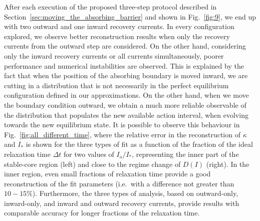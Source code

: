After each execution of the proposed three-step protocol described in Section~\ref{sec:moving_the_absorbing_barrier} and shown in Fig.~\ref{fig:9}, we end up with two outward and one inward recovery currents. In every configuration explored, we observe better reconstruction results when only the recovery currents from the outward step are considered. On the other hand, considering only the inward recovery currents or all currents simultaneously, poorer performance and numerical instabilities are observed. This is explained by the fact that when the position of the absorbing boundary is moved inward, we are cutting in a distribution that is not necessarily in the perfect equilibrium configuration defined in our approximations. On the other hand, when we move the boundary condition outward, we obtain a much more reliable observable of the distribution that populates the new available action interval, when evolving towards the new equilibrium state. It is possible to observe this behaviour in Fig.~\ref{fig:all_different_time}, where the relative error in the reconstruction of $\kappa$ and $I_\ast$ is shown for the three types of fit as a function of the fraction of the ideal relaxation time $\Delta t$ for two values of $I_\mathrm{a}/I_\ast$, representing the inner part of the stable-core region (left) and close to the regime change of $D(I)$ (right). In the inner region, even small fractions of relaxation time provide a good reconstruction of the fit parameters {(i.e.\ with a difference not greater than $10-15\%$)}. Furthermore, the three types of analysis, based on outward-only, inward-only, and inward and outward recovery currents, provide results with comparable accuracy for longer fractions of the relaxation time.  
%
